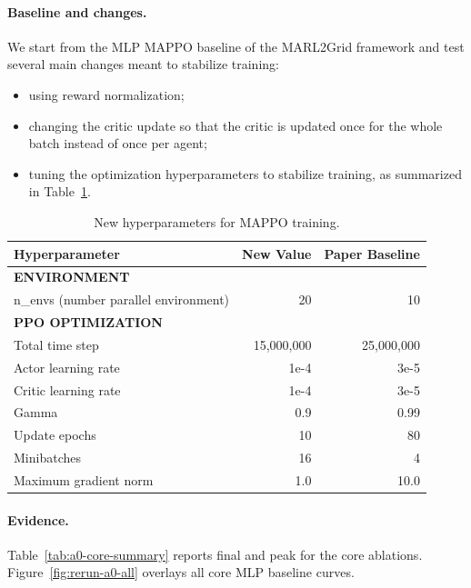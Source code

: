 \paragraph{Baseline and changes.}
We start from the MLP MAPPO baseline of the MARL2Grid framework and test several
main changes meant to stabilize training:

\begin{itemize}
  \item using reward normalization;
  \item changing the critic update so that the critic is updated once for the
  whole batch instead of once per agent;
  \item tuning the optimization hyperparameters to stabilize training, as
  summarized in Table~\ref{tab:new-hyperparameters}.
\end{itemize}

\begin{table}[H]
  \centering
  \small
  \caption{New hyperparameters for MAPPO training.}
  \label{tab:new-hyperparameters}
  \begin{tabular}{lrr}
    \toprule
    Hyperparameter & New Value & Paper Baseline \\
    \midrule
    \textbf{ENVIRONMENT} & & \\
    n\_envs (number parallel environment) & 20 & 10 \\
    \midrule
    \textbf{PPO OPTIMIZATION} & & \\
    Total time step & 15,000,000 & 25,000,000 \\
    Actor learning rate & 1e-4 & 3e-5 \\
    Critic learning rate & 1e-4 & 3e-5 \\
    Gamma & 0.9 & 0.99 \\
    Update epochs & 10 & 80 \\
    Minibatches & 16 & 4 \\
    Maximum gradient norm & 1.0 & 10.0 \\
    \bottomrule
  \end{tabular}
\end{table}

\paragraph{Evidence.}
Table~\ref{tab:a0-core-summary} reports final and peak  for the core
ablations. Figure~\ref{fig:rerun-a0-all} overlays all
core MLP baseline curves.

